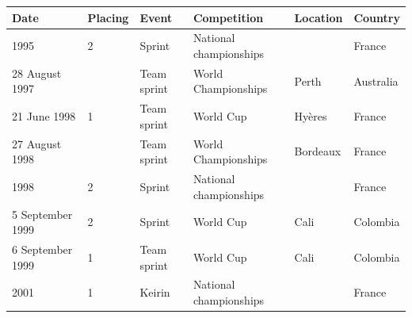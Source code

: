 \documentclass{article}
\begin{document}
\begin{tabular}{llllll}
\toprule
Date & Placing & Event & Competition & Location & Country \\
\midrule
1995 & 2 & Sprint & National championships &  & France \\
28 August 1997 &  & Team sprint & World Championships & Perth & Australia \\
21 June 1998 & 1 & Team sprint & World Cup & Hyères & France \\
27 August 1998 &  & Team sprint & World Championships & Bordeaux & France \\
1998 & 2 & Sprint & National championships &  & France \\
5 September 1999 & 2 & Sprint & World Cup & Cali & Colombia \\
6 September 1999 & 1 & Team sprint & World Cup & Cali & Colombia \\
2001 & 1 & Keirin & National championships &  & France \\
\bottomrule
\end{tabular}
\end{document}
